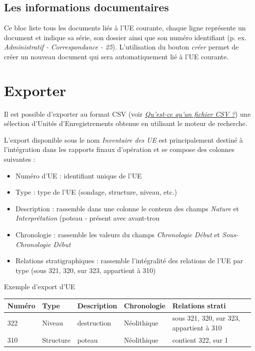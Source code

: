 \documentclass[letterpaper,10pt,french]{sphinxmanual}
\begin{document}
\subsection{Les informations documentaires}
\label{manuel/formulaire_ue:les-informations-documentaires}
Ce bloc liste tous les documents liés à l'UE courante, chaque ligne représente un document et indique sa série, son dossier ainsi que son numéro identifiant (p. ex. \emph{Administratif - Correspondance - 25}). L'utilisation du bouton \emph{créer} permet de créer un nouveau document qui sera automatiquement lié à l'UE courante.


\section{Exporter}
\label{manuel/formulaire_ue:exporter}
Il est possible d'exporter au format CSV (voir {\hyperref[manuel/questions_frequentes:def-csv]{\emph{Qu'est-ce qu'un fichier CSV ?}}}) une sélection d'Unités d'Enregistrements obtenue en utilisant le moteur de recherche.

L'export disponible sous le nom \emph{Inventaire des UE} est principalement destiné à l'intégration dans les rapports finaux d'opération et se compose des colonnes suivantes :
\begin{itemize}
\item {} 
Numéro d'UE : identifiant unique de l'UE

\item {} 
Type : type de l'UE (sondage, structure, niveau, etc.)

\item {} 
Description :  rassemble dans une colonne le contenu des champs \emph{Nature} et \emph{Interprétation} (poteau - présent avec avant-trou

\item {} 
Chronologie : rassemble les valeurs du champs \emph{Chronologie Début} et \emph{Sous-Chronologie Début}

\item {} 
Relations stratigraphiques : rassemble l'intégralité des relations de l'UE par type (sous 321, 320, sur 323, appartient à 310)

\end{itemize}


\begin{threeparttable}
\capstart\caption{Exemple d'export d'UE}

\begin{tabulary}{\linewidth}{|L|L|L|L|L|}
\hline
\textbf{
Numéro
} & \textbf{
Type
} & \textbf{
Description
} & \textbf{
Chronologie
} & \textbf{
Relations strati
}\\\hline

322
 & 
Niveau
 & 
destruction
 & 
Néolithique
 & 
sous 321, 320, sur 323, appartient à 310
\\\hline

310
 & 
Structure
 & 
poteau
 & 
Néolithique
 & 
contient 322, sur 1
\\\hline
\end{tabulary}

\end{threeparttable}
\end{document}
